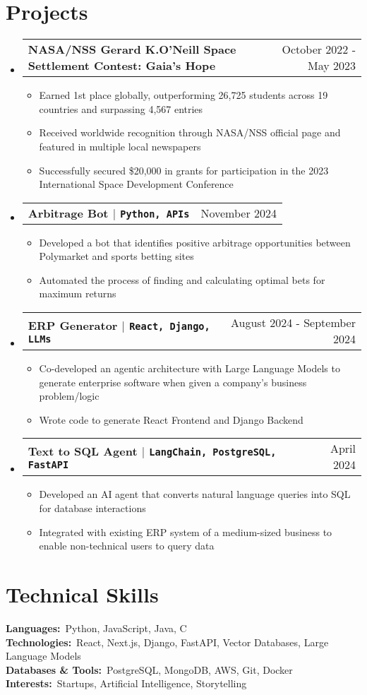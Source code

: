 \documentclass[letterpaper,10pt]{article}
\makeatletter
\newcommand{\resumeItem}[1]{
  \item\small{
    {#1 \vspace{-2pt}}
  }
}
\newcommand{\resumeProjectHeading}[2]{
    \item
    \begin{tabular*}{0.97\textwidth}{l@{\extracolsep{\fill}}r}
      \small#1 & #2 \\
    \end{tabular*}\vspace{-7pt}
}
\newcommand{\resumeSubHeadingListStart}{\begin{itemize}[leftmargin=0.15in, label={}]}
\newcommand{\resumeSubHeadingListEnd}{\end{itemize}}
\newcommand{\resumeItemListStart}{\begin{itemize}}
\newcommand{\resumeItemListEnd}{\end{itemize}\vspace{-5pt}}
\makeatother
\begin{document}
\section{Projects}
\resumeSubHeadingListStart
  \resumeProjectHeading
      {\textbf{NASA/NSS Gerard K.O'Neill Space Settlement Contest: Gaia's Hope}}{October 2022 - May 2023}
      \resumeItemListStart
        \resumeItem{Earned 1st place globally, outperforming 26,725 students across 19 countries and surpassing 4,567 entries}
        \resumeItem{Received worldwide recognition through NASA/NSS official page and featured in multiple local newspapers}
        \resumeItem{Successfully secured \$20,000 in grants for participation in the 2023 International Space Development Conference}
      \resumeItemListEnd
  \resumeProjectHeading
      {\textbf{Arbitrage Bot $|$ \textup{\texttt{Python, APIs}}}}{November 2024}
      \resumeItemListStart
        \resumeItem{Developed a bot that identifies positive arbitrage opportunities between Polymarket and sports betting sites}
        \resumeItem{Automated the process of finding and calculating optimal bets for maximum returns}
      \resumeItemListEnd

  \resumeProjectHeading
      {\textbf{ERP Generator $|$ \textup{\texttt{React, Django, LLMs}}}}{August 2024 - September 2024}
      \resumeItemListStart
        \resumeItem{Co-developed an agentic architecture with Large Language Models to generate enterprise software when given a company's business problem/logic}
        \resumeItem{Wrote code to generate React Frontend and Django Backend}
      \resumeItemListEnd
      
  \resumeProjectHeading
      {\textbf{Text to SQL Agent $|$ \textup{\texttt{LangChain, PostgreSQL, FastAPI}}}}{April 2024}
      \resumeItemListStart
        \resumeItem{Developed an AI agent that converts natural language queries into SQL for database interactions}
        \resumeItem{Integrated with existing ERP system of a medium-sized business to enable non-technical users to query data}
      \resumeItemListEnd
\resumeSubHeadingListEnd

\section{Technical Skills}
\begin{itemize}[leftmargin=0.15in, label={}]
   \small{\item{
    \textbf{Languages:}{\ Python, JavaScript, Java, C} \\
    \textbf{Technologies:}{\ React, Next.js, Django, FastAPI, Vector Databases, Large Language Models} \\
    \textbf{Databases \& Tools:}{\ PostgreSQL, MongoDB, AWS, Git, Docker} \\
    \textbf{Interests:}{\ Startups, Artificial Intelligence, Storytelling}
    }}
\end{itemize}
\end{document}
